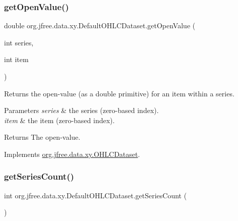 \mbox{\label{classorg_1_1jfree_1_1data_1_1xy_1_1_default_o_h_l_c_dataset_aa27c323e713453b49bad22eecd6597e2}} 
\subsubsection{\texorpdfstring{get\+Open\+Value()}{getOpenValue()}}
{\footnotesize\ttfamily double org.\+jfree.\+data.\+xy.\+Default\+O\+H\+L\+C\+Dataset.\+get\+Open\+Value (\begin{DoxyParamCaption}\item[{int}]{series,  }\item[{int}]{item }\end{DoxyParamCaption})}

Returns the open-\/value (as a double primitive) for an item within a series.


\begin{DoxyParams}{Parameters}
{\em series} & the series (zero-\/based index). \\
\hline
{\em item} & the item (zero-\/based index).\\
\hline
\end{DoxyParams}
\begin{DoxyReturn}{Returns}
The open-\/value. 
\end{DoxyReturn}


Implements \mbox{\hyperlink{interfaceorg_1_1jfree_1_1data_1_1xy_1_1_o_h_l_c_dataset_a20654fd4801bc8871dfe51bf65d62af6}{org.\+jfree.\+data.\+xy.\+O\+H\+L\+C\+Dataset}}.

\mbox{\label{classorg_1_1jfree_1_1data_1_1xy_1_1_default_o_h_l_c_dataset_af43bc16373fd6cef22a4af8f2b6aba60}} 
\subsubsection{\texorpdfstring{get\+Series\+Count()}{getSeriesCount()}}
{\footnotesize\ttfamily int org.\+jfree.\+data.\+xy.\+Default\+O\+H\+L\+C\+Dataset.\+get\+Series\+Count (\begin{DoxyParamCaption}{ }\end{DoxyParamCaption})}

